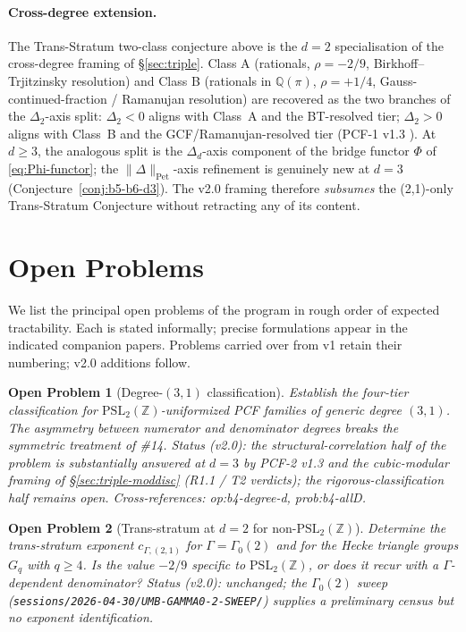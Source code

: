 \documentclass[11pt,a4paper]{article}
\newtheorem{problem}{Open Problem}
\theoremstyle{definition}
\theoremstyle{remark}
\newcommand{\PSLZ}{\mathrm{PSL}_2(\mathbb{Z})}
\newcommand{\Q}{\mathbb{Q}}
\newcommand{\PetN}[1]{\lVert #1 \rVert_{\mathrm{Pet}}}
\begin{document}
\paragraph{Cross-degree extension.}
\label{par:t2b-cross-degree}
The Trans-Stratum two-class conjecture above is the $d=2$
specialisation of the cross-degree framing of \S\ref{sec:triple}.
Class A (rationals, $\rho = -2/9$, Birkhoff--Trjitzinsky resolution)
and Class B (rationals in $\Q(\pi)$, $\rho = +1/4$,
Gauss-continued-fraction / Ramanujan resolution) are recovered as
the two branches of the $\Delta_2$-axis split: $\Delta_2 < 0$ aligns
with Class~A and the BT-resolved tier; $\Delta_2 > 0$ aligns with
Class~B and the GCF/Ramanujan-resolved tier (PCF-1 v1.3
\cite{PCF1}). At $d \geq 3$, the analogous split is the
$\Delta_d$-axis component of the bridge functor $\Phi$ of
\eqref{eq:Phi-functor}; the $\PetN{\Delta}$-axis refinement is
genuinely new at $d=3$ (Conjecture~\ref{conj:b5-b6-d3}). The
v2.0 framing therefore \emph{subsumes} the (2,1)-only Trans-Stratum
Conjecture without retracting any of its content.

\section{Open Problems}
\label{sec:open}

We list the principal open problems of the program in rough order of
expected tractability. Each is stated informally; precise formulations
appear in the indicated companion papers. Problems carried over from
v1 retain their numbering; v2.0 additions follow.

\begin{problem}[Degree-$(3,1)$ classification]
\label{prob:31}
Establish the four-tier classification for $\PSLZ$-uniformized PCF
families of generic degree $(3,1)$. The asymmetry between numerator and
denominator degrees breaks the symmetric treatment of \#14.
\emph{Status (v2.0):} the structural-correlation half of the problem is
substantially answered at $d=3$ by PCF-2 v1.3 \cite{PCF2} and the
cubic-modular framing of \S\ref{sec:triple-moddisc} (R1.1 / T2 verdicts);
the rigorous-classification half remains open. Cross-references:
\textsf{op:b4-degree-d}, \textsf{prob:b4-allD}.
\end{problem}

\begin{problem}[Trans-stratum at $d=2$ for non-$\PSLZ$]
\label{prob:t2-d2-nonpsl}
Determine the trans-stratum exponent $c_{\Gamma,(2,1)}$ for
$\Gamma = \Gamma_0(2)$ and for the Hecke triangle groups $G_q$ with
$q \geq 4$. Is the value $-2/9$ specific to $\PSLZ$, or does it
recur with a $\Gamma$-dependent denominator?
\emph{Status (v2.0):} unchanged; the $\Gamma_0(2)$ sweep
(\texttt{sessions/2026-04-30/UMB-GAMMA0-2-SWEEP/}) supplies a
preliminary census but no exponent identification.
\end{problem}
\end{document}
